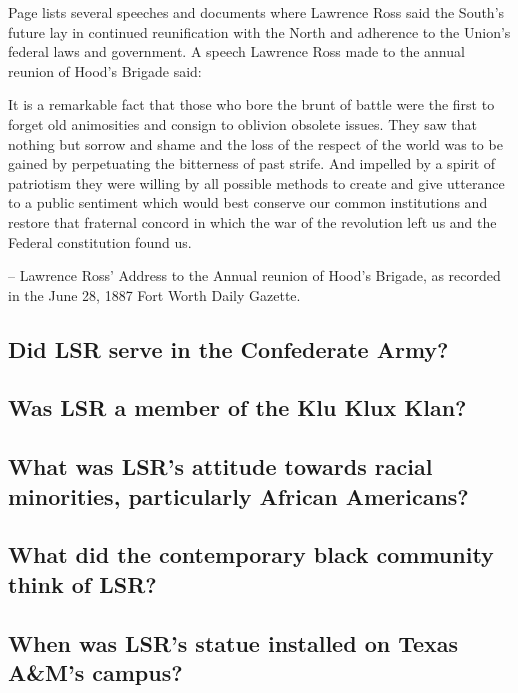 \documentclass[12pt]{article}
\begin{document}
Page \cite[pg. 161--167]{page} lists several speeches and documents where Lawrence Ross said the South's future lay in continued reunification with the North and adherence to the Union's federal laws and government. A speech Lawrence Ross made to the annual reunion of Hood's Brigade \cite{ftworthgazette} said:

\begin{displayquote}
It is a remarkable fact that those who bore the brunt of battle were the first to forget old animosities and consign to oblivion obsolete issues.  They saw that nothing but sorrow and shame and the loss of the respect of the world was to be gained by perpetuating the bitterness of past strife.  And impelled by a spirit of patriotism they were willing by all possible methods to create and give utterance to a public sentiment which would best conserve our common institutions and restore that fraternal concord in which the war of the revolution left us and the Federal constitution found us.

-- Lawrence Ross' Address to the Annual reunion of Hood's Brigade, as recorded in the June 28, 1887 Fort Worth Daily Gazette.
\end{displayquote}

\subsection{Did LSR serve in the Confederate Army?}

\subsection{Was LSR a member of the Klu Klux Klan?}

\subsection{What was LSR's attitude towards racial minorities, particularly African Americans?}

\subsection{What did the contemporary black community think of LSR?}

\subsection{When was LSR's statue installed on Texas A\&M's campus?}
\end{document}
